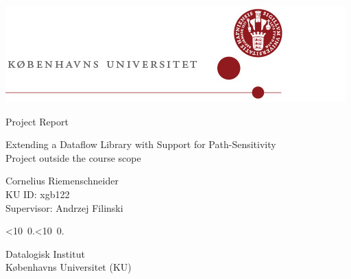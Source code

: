 \begin{titlepage}
\begin{center}
    \includegraphics[scale=1]{./logos/Logo2a.jpg}
\end{center}
\vspace{2cm}

\begin{center} \large

Project Report
\vspace{1cm}

{\Huge Extending a Dataflow Library with Support for Path-Sensitivity}\\
\vphantom{p}
Project outside the course scope
\vspace{2.5cm}

Cornelius Riemenschneider\\
KU ID: xgb122\\
Supervisor: Andrzej Filinski
\vspace{1.5cm}

\def\mydate{\leavevmode\hbox{\twodigits\day.\twodigits\month.\the\year}}
\def\twodigits#1{\ifnum#1<10 0\fi\the#1}
\mydate
\vspace{1cm}

Datalogisk Institut\\
Københavns Universitet (KU)
\end{center}
\end{titlepage}
